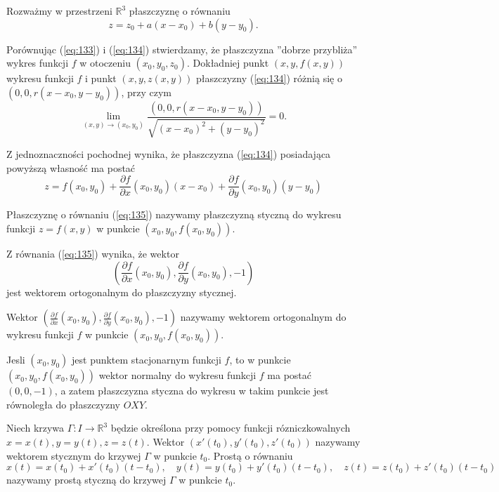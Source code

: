 \documentclass[leqno]{article}
\begin{document}
\begin{justify}
Rozważmy w przestrzeni $\mathbb{R}^3$ płaszczyznę o równaniu 
\begin{equation}\label{eq:134}
    z = z_0 + a(x - x_0) + b(y - y_0).
\end{equation}

Porównując (\ref{eq:133}) i (\ref{eq:134}) stwierdzamy, że płaszczyzna ''dobrze przybliża'' wykres funkcji $f$ w otoczeniu 
$(x_0, y_0, z_0)$. Dokładniej punkt $(x,y, f(x,y))$ wykresu funkcji $f$ i punkt $(x,y, z(x,y))$ płaszczyzny (\ref{eq:134}) różnią się o
$(0, 0, r(x-x_0, y - y_0))$, przy czym 
\[
    \lim_{(x,y) \to (x_0, y_0)}\frac{(0,0, r(x - x_0, y - y_0))}{\sqrt{{(x - x_0)}^2+{(y-y_0)}^2}} = 0.
\]

Z jednoznaczności pochodnej wynika, że płaszczyzna (\ref{eq:134}) posiadająca powyższą własność ma postać 
\begin{equation}\label{eq:135}
    z = f(x_0, y_0) + \frac{\partial f}{\partial x}(x_0, y_0)(x - x_0) + \frac{\partial f}{\partial y}(x_0, y_0)(y - y_0)
\end{equation}

\begin{defn}
    Płaszczyznę o równaniu (\ref{eq:135}) nazywamy płaszczyzną styczną do wykresu funkcji $z = f(x,y)$ w punkcie $(x_0, y_0, f(x_0, y_0))$.
\end{defn}

Z równania (\ref{eq:135}) wynika, że wektor 
\begin{equation}\label{eq:136}
    (\frac{\partial f}{\partial x}(x_0, y_0), \frac{\partial f}{\partial y}(x_0, y_0), -1)
\end{equation}
jest wektorem ortogonalnym do płaszczyzny stycznej.

\begin{defn}
    Wektor $(\frac{\partial f}{\partial x}(x_0, y_0), \frac{\partial f}{\partial y}(x_0, y_0), -1)$ nazywamy wektorem ortogonalnym do wykresu funkcji $f$ w punkcie 
    $(x_0, y_0, f(x_0, y_0))$.
\end{defn}

\begin{uwaga}
    Jesli $(x_0, y_0)$ jest punktem stacjonarnym funkcji $f$, to w punkcie $(x_0, y_0, f(x_0, y_0))$ wektor normalny do wykresu funkcji $f$ ma postać $(0,0, -1)$, 
    a zatem płaszczyzna styczna do wykresu w takim punkcie jest równoległa do płaszczyzny $OXY$. 
\end{uwaga}

\begin{defn}
    Niech krzywa $\Gamma : I \to \mathbb{R}^3$ będzie określona przy pomocy funkcji rózniczkowalnych $x = x(t), y = y(t), z = z(t)$.
    Wektor $(x'(t_0), y'(t_0), z'(t_0))$ nazywamy wektorem stycznym do krzywej $\Gamma$ w punkcie $t_0$. Prostą o równaniu 
    \[
        x(t) = x(t_0) + x'(t_0)(t - t_0), \quad y(t) = y(t_0) + y'(t_0)(t - t_0), \quad z(t) = z(t_0) + z'(t_0)(t - t_0)
    \]
    nazywamy prostą styczną do krzywej $\Gamma$ w punkcie $t_0$. 
\end{defn}


\end{justify}
\end{document}
